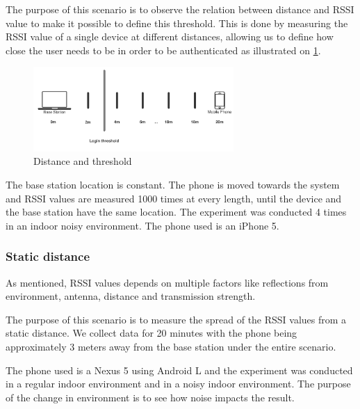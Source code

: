 The purpose of this scenario is to observe the relation between distance and RSSI value to make it possible to  define  this threshold. This is done by measuring the RSSI value of a single device at different distances, allowing us to define how close the user needs to be in order to be authenticated as illustrated on \cref{fig_distance}.

\begin{figure}
	\centering
	\includegraphics[width=3in]{img/distance}
	\caption{ Distance and threshold }
	\label{fig_distance}
\end{figure}

The base station location is constant. The phone is moved towards the system and RSSI values are measured 1000 times at every length, until the device and the base station have the same location. The experiment was conducted 4 times in an indoor noisy environment. The phone used is an iPhone 5.


\subsubsection{Static distance}
\label{section:MovingTowardsSystem}
As mentioned, RSSI values depends on multiple factors like reflections from environment, antenna, distance and transmission strength. 

The purpose of this scenario is to measure the spread of the RSSI values from a static distance. We collect data for 20 minutes with the phone being approximately 3 meters away from the base station under the entire scenario.

The phone used is a Nexus 5 using Android L and the experiment was conducted in a regular indoor environment and in a noisy indoor environment. The purpose of the change in environment is to see how noise impacts the result.


